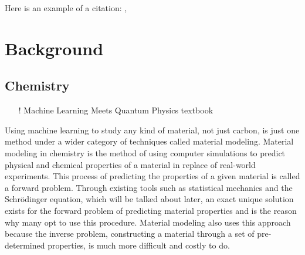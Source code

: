\documentclass[12pt]{scrartcl}
\begin{document}
Here is an example of a citation: \cite{gap20}, \cite{DGL}

\newpage

\section{Background}

\subsection{Chemistry}
\begin{itemize}
    \item[!] Machine Learning Meets Quantum Physics textbook
\end{itemize}

Using machine learning to study any kind of material, not just carbon, is just one method under a wider category of techniques called material modeling. Material modeling in chemistry is the method of using computer simulations to predict physical and chemical properties of a material in replace of real-world experiments. This process of predicting the properties of a given material is called a forward problem. Through existing tools such as statistical mechanics and the Schrödinger equation, which will be talked about later, an exact unique solution exists for the forward problem of predicting material properties and is the reason why many opt to use this procedure. Material modeling also uses this approach because the inverse problem, constructing a material through a set of pre-determined properties, is much more difficult and costly to do.
\end{document}
